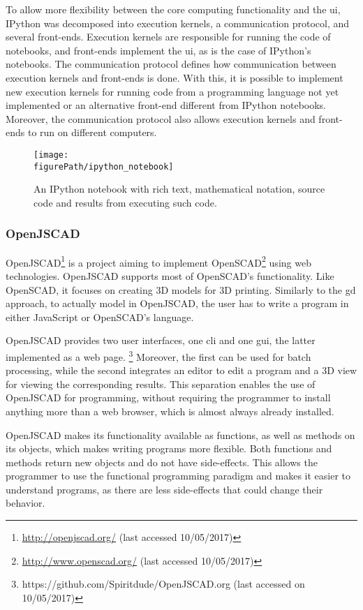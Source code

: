 To allow more flexibility between the core computing functionality and the \gls{ui}, IPython was decomposed into execution kernels, a communication protocol, and several front-ends.
Execution kernels are responsible for running the code of notebooks, and front-ends implement the \gls{ui}, as is the case of IPython's notebooks.
The communication protocol defines how communication between execution kernels and front-ends is done.
With this, it is possible to implement new execution kernels for running code from a programming language not yet implemented or an alternative front-end different from IPython notebooks.
Moreover, the communication protocol also allows execution kernels and front-ends to run on different computers\cite{PER-GRA:2007}.

\begin{figure}
	\centering
	\texttt{[image: \\figurePath/ipython\_notebook]}
	\caption{An IPython notebook with rich text, mathematical notation, source code and results from executing such code.}
	\label{fig:ipython:notebook}
\end{figure}


\subsubsection{OpenJSCAD}
OpenJSCAD\footnote{\url{http://openjscad.org/} (last accessed 10/05/2017)} is a project aiming to implement OpenSCAD\footnote{\url{http://www.openscad.org/} (last accessed 10/05/2017)} using web technologies.
OpenJSCAD supports most of OpenSCAD's functionality.
Like OpenSCAD, it focuses on creating 3D models for 3D printing.
Similarly to the \gls{gd} approach, to actually model in OpenJSCAD, the user has to write a program in either JavaScript or OpenSCAD's language.

OpenJSCAD provides two user interfaces, one \acrfull{cli} and one \acrfull{gui}, the latter implemented as a web page.%
\footnote{https://github.com/Spiritdude/OpenJSCAD.org (last accessed on 10/05/2017)}
Moreover, the first can be used for batch processing, while the second integrates an editor to edit a program and a 3D view for viewing the corresponding results.
This separation enables the use of OpenJSCAD for programming, without requiring the programmer to install anything more than a web browser, which is almost always already installed.

OpenJSCAD makes its functionality available as functions, as well as methods on its objects, which makes writing programs more flexible.
Both functions and methods return new objects and do not have side-effects.
This allows the programmer to use the functional programming paradigm and makes it easier to understand programs, as there are less side-effects that could change their behavior.


